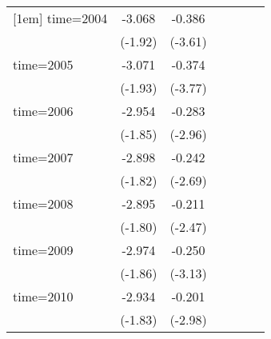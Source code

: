 \begin{table}[htbp]
\begin{tabular}{l*{6}{c}}
[1em]
time=2004           &      -3.068\sym{*}  &      -0.386\sym{***}&                     &                     &                     &                     \\
                    &     (-1.92)         &     (-3.61)         &                     &                     &                     &                     \\
[1em]
time=2005           &      -3.071\sym{*}  &      -0.374\sym{***}&                     &                     &                     &                     \\
                    &     (-1.93)         &     (-3.77)         &                     &                     &                     &                     \\
[1em]
time=2006           &      -2.954\sym{*}  &      -0.283\sym{***}&                     &                     &                     &                     \\
                    &     (-1.85)         &     (-2.96)         &                     &                     &                     &                     \\
[1em]
time=2007           &      -2.898\sym{*}  &      -0.242\sym{**} &                     &                     &                     &                     \\
                    &     (-1.82)         &     (-2.69)         &                     &                     &                     &                     \\
[1em]
time=2008           &      -2.895\sym{*}  &      -0.211\sym{**} &                     &                     &                     &                     \\
                    &     (-1.80)         &     (-2.47)         &                     &                     &                     &                     \\
[1em]
time=2009           &      -2.974\sym{*}  &      -0.250\sym{***}&                     &                     &                     &                     \\
                    &     (-1.86)         &     (-3.13)         &                     &                     &                     &                     \\
[1em]
time=2010           &      -2.934\sym{*}  &      -0.201\sym{***}&                     &                     &                     &                     \\
                    &     (-1.83)         &     (-2.98)         &                     &                     &                     &                     \\

\end{tabular}
\end{table}
